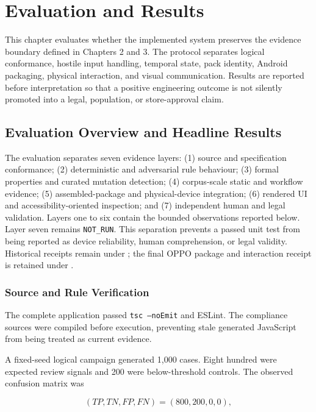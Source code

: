 \section{Evaluation and Results}

This chapter evaluates whether the implemented system preserves the evidence boundary defined in Chapters 2 and 3. The protocol separates logical conformance, hostile input handling, temporal state, pack identity, Android packaging, physical interaction, and visual communication. Results are reported before interpretation so that a positive engineering outcome is not silently promoted into a legal, population, or store-approval claim.

\subsection{Evaluation Overview and Headline Results}

The evaluation separates seven evidence layers: (1) source and specification conformance; (2) deterministic and adversarial rule behaviour; (3) formal properties and curated mutation detection; (4) corpus-scale static and workflow evidence; (5) assembled-package and physical-device integration; (6) rendered UI and accessibility-oriented inspection; and (7) independent human and legal validation. Layers one to six contain the bounded observations reported below. Layer seven remains \texttt{NOT\_RUN}. This separation prevents a passed unit test from being reported as device reliability, human comprehension, or legal validity. Historical receipts remain under ; the final OPPO package and interaction receipt is retained under .

\subsubsection{Source and Rule Verification}

The complete application passed \texttt{tsc --noEmit} and ESLint. The compliance sources were compiled before execution, preventing stale generated JavaScript from being treated as current evidence.

A fixed-seed logical campaign generated 1,000 cases. Eight hundred were expected review signals and 200 were below-threshold controls. The observed confusion matrix was

\begin{equation}
(TP,TN,FP,FN)=(800,200,0,0),
\end{equation}

